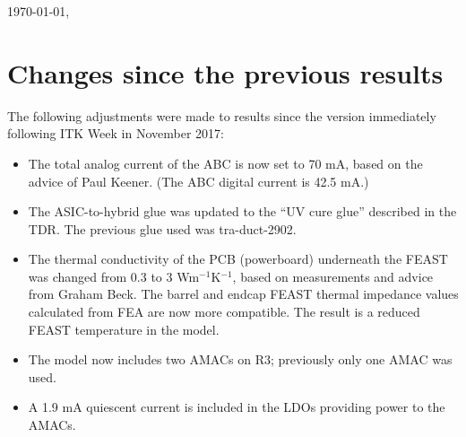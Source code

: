 \documentclass[10pt]{article}
\begin{document}
\thispagestyle{empty}

\today, \currenttime

\section{Changes since the previous results}

The following adjustments were made to results since the version immediately following ITK Week in
November 2017:
\begin{itemize}
\item The total analog current of the ABC is now set to 70 mA, based on the advice of Paul Keener.
(The ABC digital current is 42.5 mA.)
\item The ASIC-to-hybrid glue was updated to the ``UV cure glue'' described in the TDR. The previous
  glue used was tra-duct-2902.
\item The thermal conductivity of the PCB (powerboard) underneath the FEAST was changed from 0.3 to
3 Wm$^{-1}$K$^{-1}$, based on measurements and advice from Graham Beck. The barrel and endcap FEAST
thermal impedance values calculated from FEA are now more compatible. The result is a reduced FEAST
temperature in the model.
\item The model now includes two AMACs on R3; previously only one AMAC was used.
\item A 1.9 mA quiescent current is included in the LDOs providing power to the AMACs.
\end{itemize}


\clearpage

\clearpage

\clearpage

\clearpage

\end{document}
